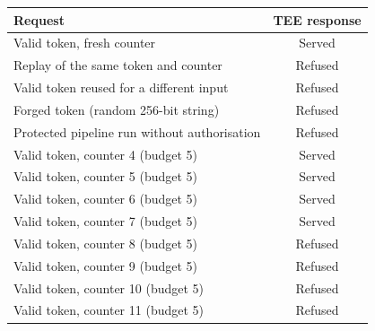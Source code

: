 \footnotesize
\begin{tabular}{@{}lc@{}}
\toprule
Request & TEE response \\
\midrule
Valid token, fresh counter & Served \\
Replay of the same token and counter & Refused \\
Valid token reused for a different input & Refused \\
Forged token (random 256-bit string) & Refused \\
Protected pipeline run without authorisation & Refused \\
Valid token, counter 4 (budget 5) & Served \\
Valid token, counter 5 (budget 5) & Served \\
Valid token, counter 6 (budget 5) & Served \\
Valid token, counter 7 (budget 5) & Served \\
Valid token, counter 8 (budget 5) & Refused \\
Valid token, counter 9 (budget 5) & Refused \\
Valid token, counter 10 (budget 5) & Refused \\
Valid token, counter 11 (budget 5) & Refused \\
\bottomrule
\end{tabular}
